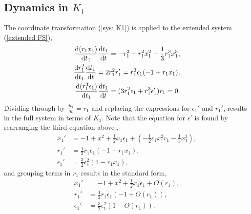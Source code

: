 \subsection{Dynamics in \texorpdfstring{$K_1$}{K1}}\label{sec:dynamics-in-texorpdfstringk1k1} 
The coordinate transformation (\ref{sys: K1}) is applied to the extended system (\ref{extended FS}), 
\begin{align*}
\frac{\dif (r_1x_1)}{\dif t_1} \frac{\dif t_1}{\dif t} = -r_1^2 + r_1^2x_1^2 - \frac{1}{3}r_1^3x_1^3,\\
\frac{\dif r_1^2}{\dif t_1}\frac{\dif t_1}{\dif t}= 2r_1^2r_1' = r_1^3 \epsilon_1 (-1 +r_1 x_1),\\
\frac{\dif (r_1^3 \epsilon_1)}{\dif t_1}\frac{\dif t_1}{\dif t}= (3r_1^2\epsilon_1 + r_1^3 \epsilon_1') r_1 = 0.
\end{align*}
Dividing through by $\frac{dt_1}{dt}=r_1$ and replacing the expressions for $\epsilon_1'$ and $r_1'$, results in the full system in terms of $K_1$. Note that the equation for $\epsilon'$ is found by rearranging the third equation above \st,
\begin{align*}
x_1' &= -1 +x^2 + \frac{1}{2} x_1 \epsilon_1 + \left( - \frac{1}{2} \epsilon_1 x_1^2r_1 - \frac{1}{3} x_1^3 \right),\\
r_1' &= \frac{1}{2} r_1 \epsilon_1( -1 + r_1 x_1),\\
\epsilon_1' &= \frac{3}{2} \epsilon_1^2 ( 1- r_1x_1),
\end{align*}
and grouping terms in $r_1$ results in the standard form,
\begin{equation}
\begin{aligned} \label{K1systemfull}
x_1' &= -1 +x^2 + \frac{1}{2} x_1 \epsilon_1 +O(r_1),\\
r_1' &= \frac{1}{2} r_1 \epsilon_1( -1 + O(r_1)),\\
\epsilon_1' &= \frac{3}{2} \epsilon_1^2 ( 1- O(r_1)).
\end{aligned}
\end{equation}

